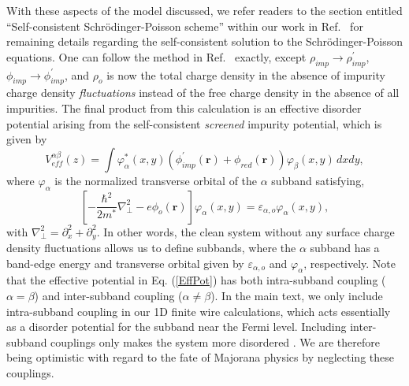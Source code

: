 \documentclass[aps,prmaterials,twocolumn,superscriptaddress,longbibliography]{revtex4-2}
\begin{document}
With these aspects of the model discussed, we refer readers to the section entitled ``Self-consistent Schr{\"o}dinger-Poisson scheme'' within our work in Ref.~ for remaining details regarding the self-consistent solution to the Schr{\"o}dinger-Poisson equations. One can follow the method in Ref.~ exactly, except $\rho_{imp} \rightarrow \rho_{imp}^\prime$, $\phi_{imp} \rightarrow \phi_{imp}^\prime$, and $\rho_o$ is now the total charge density in the absence of impurity charge density \textit{fluctuations} instead of the free charge density in the absence of all impurities. The final product from this calculation is an effective disorder potential arising from the self-consistent \textit{screened} impurity potential, which is given by
\begin{equation}
    V_{eff}^{\alpha \beta}(z) = 
    \int \varphi_{\alpha}^*(x,y)
    \left(
    \phi_{imp}^\prime(\mathbf{r}) 
    + \phi_{red}(\mathbf{r}) 
    \right)
    \varphi_{\beta}(x,y) \, dxdy, \label{EffPot}
\end{equation}
where $\varphi_{\alpha}$ is the normalized transverse orbital of the $\alpha$ subband satisfying,
\begin{equation}
    \left[
    -\frac{\hbar^2}{2 m^*} 
	\nabla^2_\perp 
	- e \phi_o\left(\mathbf{r}\right)
	\right] \varphi_{\alpha}(x,y) = \varepsilon_{\alpha,o} \varphi_{\alpha}(x,y),
\end{equation}
with $\nabla_\perp^2 = \partial_x^2 + \partial_y^2$. In other words, the clean system without any surface charge density fluctuations allows us to define subbands, where the $\alpha$ subband has a band-edge energy and transverse orbital given by $\varepsilon_{\alpha,o}$ and $\varphi_{\alpha}$, respectively. Note that the effective potential in Eq. (\ref{EffPot}) has both intra-subband coupling ($\alpha = \beta$) and inter-subband coupling ($\alpha \neq \beta$). In the main text, we only include intra-subband coupling in our 1D finite wire calculations, which acts essentially as a disorder potential for the subband near the Fermi level. Including inter-subband couplings only makes the system more disordered \cite{woods2019zeroenergy,pan2020generic}. We are therefore being optimistic with regard to the fate of Majorana physics by neglecting these couplings.
\end{document}
